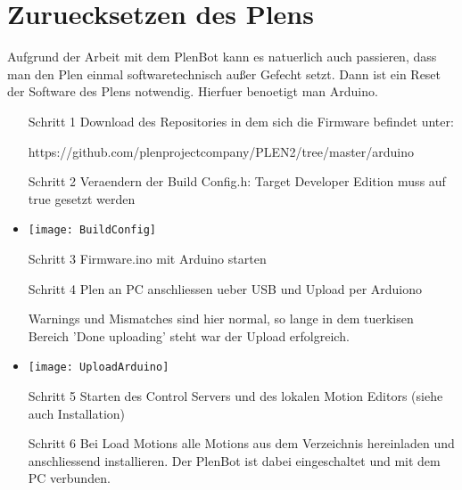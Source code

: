 \documentclass[11pt]{scrartcl}
\begin{document}
\newpage

\section{Zuruecksetzen des Plens}
Aufgrund der Arbeit mit dem PlenBot kann es natuerlich auch passieren, dass man den Plen einmal softwaretechnisch außer Gefecht setzt. Dann ist ein Reset der Software des Plens notwendig. Hierfuer benoetigt man Arduino. 
\begin{itemize}
\item[Schritt 1]
Download des Repositories in dem sich die Firmware befindet unter:

https://github.com/plenprojectcompany/PLEN2/tree/master/arduino 
\item[Schritt 2]
Veraendern der Build Config.h:
Target Developer Edition muss auf true gesetzt werden
\item
\begin{center}
\texttt{[image: BuildConfig]}
\end{center}

\item[Schritt 3]
Firmware.ino mit Arduino starten
\newpage
\item[Schritt 4]
Plen an PC anschliessen ueber USB und Upload per Arduiono

Warnings und Mismatches sind hier normal, so lange in dem tuerkisen Bereich 'Done uploading' steht war der Upload erfolgreich. 

\item
\begin{center}
\texttt{[image: UploadArduino]}
\end{center}

\item[Schritt 5]
Starten des Control Servers und des lokalen Motion Editors (siehe auch Installation)

\item[Schritt 6]
Bei Load Motions alle Motions aus dem Verzeichnis hereinladen und anschliessend installieren. Der PlenBot ist dabei eingeschaltet und mit dem PC verbunden.
\end{itemize}
\end{document}
